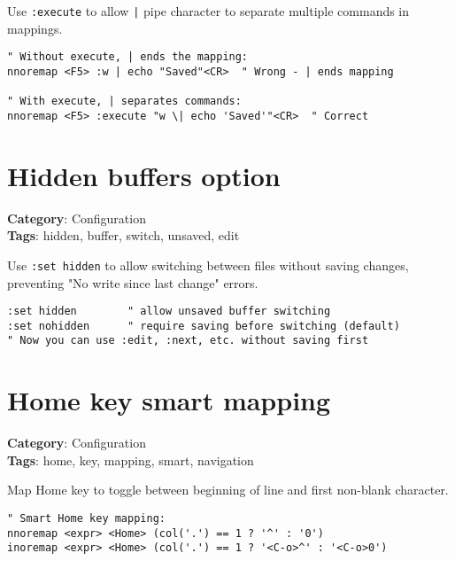 {{{Use {\footnotesize \Verb§:execute§} to allow {\footnotesize \Verb§|§} pipe character to separate multiple commands in mappings.

\begin{Exa*}{}
\begin{Verbatim}[fontsize=\footnotesize, breaklines, breakanywhere]
" Without execute, | ends the mapping:
nnoremap <F5> :w | echo "Saved"<CR>  " Wrong - | ends mapping

" With execute, | separates commands:
nnoremap <F5> :execute "w \| echo 'Saved'"<CR>  " Correct
\end{Verbatim}
\end{Exa*}

\section{Hidden buffers option}

\textbf{Category}: Configuration\\ \textbf{Tags}: hidden, buffer, switch, unsaved, edit
\vspace{0.5cm}

Use {\footnotesize \Verb§:set hidden§} to allow switching between files without saving changes, preventing "No write since last change" errors.

\begin{Exa*}{}
\begin{Verbatim}[fontsize=\footnotesize, breaklines, breakanywhere]
:set hidden        " allow unsaved buffer switching
:set nohidden      " require saving before switching (default)
" Now you can use :edit, :next, etc. without saving first
\end{Verbatim}
\end{Exa*}

\section{Home key smart mapping}

\textbf{Category}: Configuration\\ \textbf{Tags}: home, key, mapping, smart, navigation
\vspace{0.5cm}

Map Home key to toggle between beginning of line and first non-blank character.

\begin{Exa*}{}
\begin{Verbatim}[fontsize=\footnotesize, breaklines, breakanywhere]
" Smart Home key mapping:
nnoremap <expr> <Home> (col('.') == 1 ? '^' : '0')
inoremap <expr> <Home> (col('.') == 1 ? '<C-o>^' : '<C-o>0')


\end{Verbatim}
\end{Exa*}}}}
